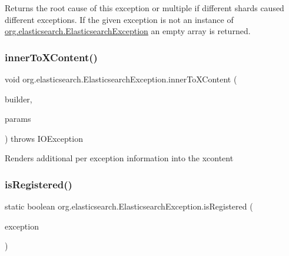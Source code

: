 Returns the root cause of this exception or multiple if different shards caused different exceptions. If the given exception is not an instance of \hyperlink{}{org.\+elasticsearch.\+Elasticsearch\+Exception} an empty array is returned. \hypertarget{classorg_1_1elasticsearch_1_1_elasticsearch_exception_a05b642f5d4bc79afdd5629c2a003c889}{}\label{classorg_1_1elasticsearch_1_1_elasticsearch_exception_a05b642f5d4bc79afdd5629c2a003c889} 
\subsubsection{\texorpdfstring{inner\+To\+X\+Content()}{innerToXContent()}}
{\footnotesize\ttfamily void org.\+elasticsearch.\+Elasticsearch\+Exception.\+inner\+To\+X\+Content (\begin{DoxyParamCaption}\item[{X\+Content\+Builder}]{builder,  }\item[{Params}]{params }\end{DoxyParamCaption}) throws I\+O\+Exception\hspace{0.3cm}{\ttfamily [protected]}}

Renders additional per exception information into the xcontent \hypertarget{classorg_1_1elasticsearch_1_1_elasticsearch_exception_ab1d7b8b3886de9c733b6822408e118bf}{}\label{classorg_1_1elasticsearch_1_1_elasticsearch_exception_ab1d7b8b3886de9c733b6822408e118bf} 
\subsubsection{\texorpdfstring{is\+Registered()}{isRegistered()}}
{\footnotesize\ttfamily static boolean org.\+elasticsearch.\+Elasticsearch\+Exception.\+is\+Registered (\begin{DoxyParamCaption}\item[{Class$<$? extends Throwable $>$}]{exception }\end{DoxyParamCaption})\hspace{0.3cm}{\ttfamily [static]}}

